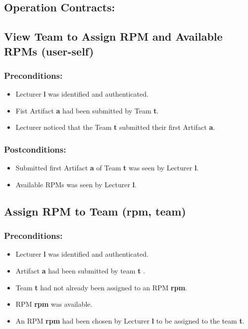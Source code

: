 


\subsection*{Operation Contracts:}
\subsection*{View Team to Assign RPM and Available RPMs (user-self)}
\subsubsection*{Preconditions:}
\begin{itemize}
\itemsep-1.5em 
    \item Lecturer \textbf{l} was identified and authenticated. 
    \item Fist Artifact \textbf{a} had been submitted by Team \textbf{t}.
    \item Lecturer noticed that the Team \textbf{t} submitted their first Artifact \textbf{a}.
\end{itemize}



\subsubsection*{Postconditions:}
\begin{itemize}
\itemsep-1.5em 
    \item Submitted first Artifact \textbf{a} of Team \textbf{t} was seen by Lecturer \textbf{l}.
    \item Available RPMs was seen by Lecturer \textbf{l}.
\end{itemize}



\subsection*{Assign RPM to Team (rpm, team)}
\subsubsection*{Preconditions:}
\begin{itemize}
\itemsep-1.5em 
    \item Lecturer \textbf{l} was identified and authenticated.
    \item Artifact \textbf{a} had been submitted by team \textbf{t} .
    \item Team \textbf{t} had not already been assigned to an RPM \textbf{rpm}.
    \item RPM \textbf{rpm} was available.
    \item An RPM \textbf{rpm} had been chosen by Lecturer \textbf{l} to be assigned to the team \textbf{t}.
\end{itemize}



